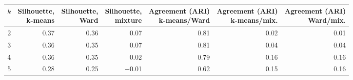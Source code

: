 \footnotesize\setlength{\tabcolsep}{4pt}
\begin{tabular}{rrrrrrr}
\toprule
$k$ & \shortstack[r]{Silhouette,\\k-means} & \shortstack[r]{Silhouette,\\Ward} & \shortstack[r]{Silhouette,\\mixture} & \shortstack[r]{Agreement (ARI)\\k-means/Ward} & \shortstack[r]{Agreement (ARI)\\k-means/mix.} & \shortstack[r]{Agreement (ARI)\\Ward/mix.} \\
\midrule
2 & 0.37 & 0.36 & 0.07 & 0.81 & 0.02 & 0.01 \\
3 & 0.36 & 0.35 & 0.07 & 0.81 & 0.04 & 0.04 \\
4 & 0.36 & 0.35 & 0.02 & 0.79 & 0.16 & 0.16 \\
5 & 0.28 & 0.25 & $-$0.01 & 0.62 & 0.15 & 0.16 \\
\bottomrule
\end{tabular}
